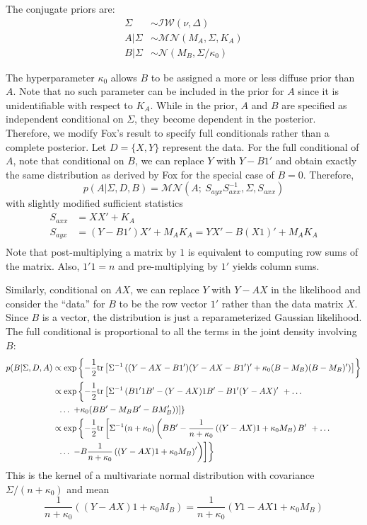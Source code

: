 \documentclass{article} %
\begin{document}
The conjugate priors are:
\begin{align*}
\Sigma&\sim\mathcal{IW}(\nu,\Delta)\\
A|\Sigma&\sim\mathcal{MN}(M_A,\Sigma,K_A)\\
B|\Sigma&\sim\mathcal{N}(M_B,\Sigma/\kappa_0)
\end{align*}

The hyperparameter $\kappa_0$ allows $B$ to be assigned a more or less diffuse prior than $A$. Note that no such parameter can be included in the prior for $A$ since it is unidentifiable with respect to $K_A$. While in the prior, $A$ and $B$ are specified as independent conditional on $\Sigma$, they become dependent in the posterior. Therefore, we modify Fox's result to specify full conditionals rather than a complete posterior. Let $D=\{X,Y\}$ represent the data. For the full conditional of $A$, note that conditional on $B$, we can replace $Y$ with $Y-B 1'$ and obtain exactly the same distribution as derived by Fox for the special case of $B=0$. Therefore,
\[p(A|\Sigma,D,B)=\mathcal{MN}\left(A;~S_{ayx}S^{-1}_{axx},\Sigma,S_{axx}\right)\]
with slightly modified sufficient statistics
\begin{align*}
S_{axx} &= XX'+K_A\\
S_{ayx} &= (Y-B 1')X'+M_A K_A = YX'-B (X1)'+M_A K_A\\
\end{align*}
Note that post-multiplying a matrix by $1$ is equivalent to computing row sums of the matrix. Also, $1'1=n$ and pre-multiplying by $1'$ yields column sums.

Similarly, conditional on $AX$, we can replace $Y$ with $Y-AX$ in the likelihood and consider the ``data'' for $B$ to be the row vector $1'$ rather than the data matrix $X$. Since $B$ is a vector, the distribution is just a reparameterized Gaussian likelihood. The full conditional is proportional to all the terms in the joint density involving $B$:
\begin{align*}
p(B|\Sigma,D,A)&\propto\exp\left\{-\frac{1}{2}\mbox{tr}\left[\Sigma^{-1}\left((Y-AX-B1')(Y-AX-B1')' + \kappa_0(B-M_B)(B-M_B)'\right)\right]\right\}\\
&\propto\exp\left\{-\frac{1}{2}\mbox{tr}\left[\Sigma^{-1}\left(B1'1B'-(Y-AX)1B'-B1'(Y-AX)'\right.\right.\right.+\ldots\\
&~~\ldots\left.\left.\left.+\kappa_0(BB'-M_BB'-BM_B')\right)\right]\right\}\\
&\propto\exp\left\{-\frac{1}{2}\mbox{tr}\left[\Sigma^{-1}(n+\kappa_0)\left(BB'-\frac{1}{n+\kappa_0}\left((Y-AX)1+\kappa_0M_B\right)B'\right.\right.\right.+\ldots\\
&~~\ldots\left.\left.\left.-B\frac{1}{n+\kappa_0}\left((Y-AX)1+\kappa_0M_B\right)'\right)\right]\right\}
\end{align*}
This is the kernel of a multivariate normal distribution with covariance $\Sigma/(n+\kappa_0)$ and mean
\[\frac{1}{n+\kappa_0}\left((Y-AX)1+\kappa_0M_B\right) = \frac{1}{n+\kappa_0}\left(Y1-AX1+\kappa_0M_B\right)\]
\end{document}
